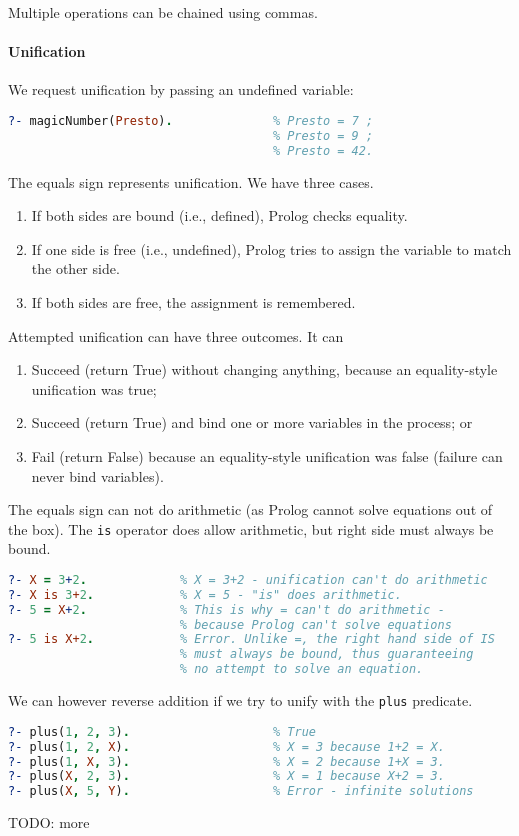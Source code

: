 Multiple operations can be chained using commas.

\paragraph{Unification}
We request unification by passing an undefined variable:
\begin{lstlisting}[language=prolog, style=snippet]
?- magicNumber(Presto).              % Presto = 7 ;
                                     % Presto = 9 ;
                                     % Presto = 42.
\end{lstlisting}
The equals sign represents unification. We have three cases.
\begin{enumerate}
\item If both sides are bound (i.e., defined), Prolog checks equality.
\item If one side is free (i.e., undefined), Prolog tries to assign the variable to match the other side.
\item If both sides are free, the assignment is remembered.
\end{enumerate}
Attempted unification can have three outcomes. It can
\begin{enumerate}
\item Succeed (return True) without changing anything, because an equality-style unification was true;
\item Succeed (return True) and bind one or more variables in the process; or
\item Fail (return False) because an equality-style unification was false (failure can never bind variables).
\end{enumerate}


The equals sign can not do arithmetic (as Prolog cannot solve equations out of the box). The \texttt{is} operator does allow arithmetic, but right side must always be bound.
\begin{lstlisting}[language=prolog, style=snippet]
?- X = 3+2.             % X = 3+2 - unification can't do arithmetic
?- X is 3+2.            % X = 5 - "is" does arithmetic.
?- 5 = X+2.             % This is why = can't do arithmetic -
                        % because Prolog can't solve equations
?- 5 is X+2.            % Error. Unlike =, the right hand side of IS
                        % must always be bound, thus guaranteeing
                        % no attempt to solve an equation.
\end{lstlisting}
We can however reverse addition if we try to unify with the \texttt{plus} predicate.
\begin{lstlisting}[language=prolog, style=snippet]
?- plus(1, 2, 3).                    % True
?- plus(1, 2, X).                    % X = 3 because 1+2 = X.
?- plus(1, X, 3).                    % X = 2 because 1+X = 3.
?- plus(X, 2, 3).                    % X = 1 because X+2 = 3.
?- plus(X, 5, Y).                    % Error - infinite solutions
\end{lstlisting}

TODO: more
